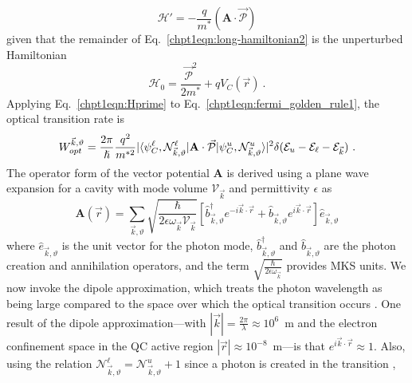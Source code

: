 \documentclass[12pt]{report}
\begin{document}
{\begin{equation}
\label{chpt1eqn:Hprime}
\mathscr{H}'=-\frac{q}{m^*}\left({\textbf{A}} \cdot \vec{\mathcal{P}} \right)
\end{equation}
given that the remainder of Eq.~\eqref{chpt1eqn:long-hamiltonian2} is the unperturbed Hamiltonian
\begin{equation}
\mathscr{H}_0=\frac{\vec{\mathcal{P}}^2}{2 m^*} + q V_C(\vec{r}) {~.}
\end{equation}
Applying Eq.~\eqref{chpt1eqn:Hprime} to Eq.~\eqref{chpt1eqn:fermi_golden_rule1}, the optical transition rate is
\begin{equation}
\label{chpt1eqn:fermi_golden_rule2}
W_{opt}^{\vec{k},\vartheta} = \frac{2 \pi}{\hslash} \frac{q^2}{m^{*2}} \vert\langle \psi_C^\ell,\mathcal{N}^\ell_{\vec{k},\vartheta} \vert {\textbf{A}} \cdot \vec{\mathcal{P}}
\vert \psi_C^u,\mathcal{N}^u_{\vec{k},\vartheta}  \rangle\vert^2 \delta(\EE_u-\EE_\ell-\EE_{\vec{k}}) {~.}
\end{equation}
The operator form of the vector potential ${\textbf{A}}$ is derived using a plane wave expansion for a cavity with mode volume $\mathcal{V}_{\vec{k}}$ and permittivity $\epsilon$ as \cite{Parker:book:2005}
\begin{equation}
{\textbf{A}}(\vec{r})=\sum_{\vec{k},\vartheta} \sqrt{\frac{\hslash}{2 \epsilon \omega_{\vec{k}} \mathcal{V}_{\vec{k}}}} \left[ \hat{b}^\dagger_{\vec{k},\vartheta} e^{-i \vec{k} \cdot \vec{r}} +  \hat{b}_{\vec{k},\vartheta} e^{i \vec{k} \cdot \vec{r}}\right]
\hat{e}_{\vec{k},\vartheta}
\end{equation}
where $\hat{e}_{\vec{k},\vartheta}$ is the unit vector for the photon mode, $\hat{b}^\dagger_{\vec{k},\vartheta}$ and $\hat{b}_{\vec{k},\vartheta}$ are the photon creation and annihilation operators, and the term $\sqrt{\frac{\hslash}{2 \epsilon \omega_{\vec{k}}}}$ provides MKS units.  We now invoke the dipole approximation, which treats the photon wavelength as being large compared to the space over which the optical transition occurs \cite{Parker:book:2005}. One result of the dipole approximation---with $|\vec{k}|=\frac{2\pi}{\lambda}\approx10^6$~m and the electron confinement space in the QC active region $|\vec{r}|\approx10^{-8}$~m---is that $e^{i \vec{k} \cdot \vec{r}}\approx1$.  Also, using the relation $\mathcal{N}_{\vec{k},\vartheta}^\ell=\mathcal{N}_{\vec{k},\vartheta}^u+1$ since a photon is created in the transition ,
\begin{subequations}
\begin{gather}

\end{gather}
\end{subequations}}
\end{document}
